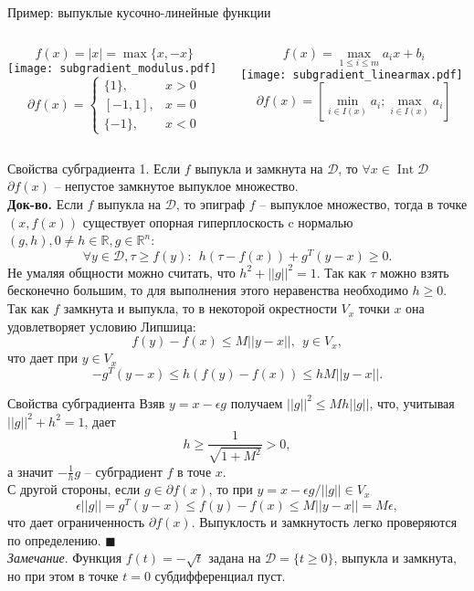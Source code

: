 \documentclass[10pt, handout]{beamer}
\DeclareMathOperator{\interior}{Int}
\begin{document}
\begin{frame}{Пример: выпуклые кусочно-линейные функции}
\begin{columns}
\begin{column}{.5\textwidth}
$$
f(x)=|x|=\max\{x, -x\}
$$
\texttt{[image: subgradient\_modulus.pdf]}
$$
\partial f(x)=\begin{cases}
\{1\}, & x > 0\\
[-1, 1], & x=0\\
\{-1\}, & x < 0
\end{cases}
$$
\end{column}
\begin{column}{.5\textwidth}
$$
f(x)=\max_{1\leq i\leq m}a_ix+b_i
$$
\texttt{[image: subgradient\_linearmax.pdf]}
$$
\partial f(x)=\left[\min_{i\in I(x)}a_i;\max_{i\in I(x)}a_i\right]
$$
\end{column}
\end{columns}
\end{frame}


\begin{frame}{Свойства субградиента}
1. Если $f$ выпукла и замкнута на $\mathcal{D}$, то $\forall x\in\interior\mathcal{D}$ $\partial f(x)$ -- непустое замкнутое выпуклое множество.\\
\vspace{1em}\pause
\textbf{Док-во.} Если $f$ выпукла на $\mathcal{D}$, то эпиграф $f$ -- выпуклое множество, тогда в точке $(x, f(x))$ существует опорная гиперплоскость c нормалью $(g, h), 0\neq h\in \mathbb{R}, g\in\mathbb{R}^n$:
$$
\forall y\in \mathcal{D}, \tau\geq f(y):~~h(\tau-f(x))+g^T(y-x)\geq 0.
$$
Не умаляя общности можно считать, что $h^2+||g||^2=1$. Так как $\tau$ можно взять бесконечно большим, то
для выполнения этого неравенства необходимо $h\geq 0$.\\
\pause
Так как $f$ замкнута и выпукла, то в некоторой окрестности $V_x$ точки $x$ она удовлетворяет условию Липшица:
$$
f(y)-f(x)\leq M||y-x||,~~y\in V_x,
$$
что дает при $y\in V_x$
$$
-g^T(y-x)\leq h(f(y)-f(x))\leq hM||y-x||.
$$

\end{frame}

\begin{frame}{Свойства субградиента}
Взяв $y=x-\epsilon g$ получаем $||g||^2\leq Mh||g||$, что, учитывая $||g||^2+h^2=1$, дает
$$
h\geq \frac{1}{\sqrt{1+M^2}}>0,
$$
а значит $-\frac{1}{h}g$ -- субградиент $f$ в точе $x$.\\
\pause
\vspace{1em}
С другой стороны, если $g\in \partial f(x)$, то при $y=x-\epsilon g / ||g||\in V_x$
$$
\epsilon ||g||=g^T(y-x)\leq f(y)-f(x)\leq M||y-x||=M\epsilon,
$$
что дает ограниченность $\partial f(x)$. Выпуклость и замкнутость легко проверяются по определению. $\blacksquare$\\
\pause
\vspace{1em}
\textit{Замечание}. Функция $f(t)=-\sqrt{t}$ задана на $\mathcal{D}=\{t\geq 0\}$, выпукла и замкнута, но при этом
в точке $t=0$ субдифференциал пуст.
\end{frame}
\end{document}
